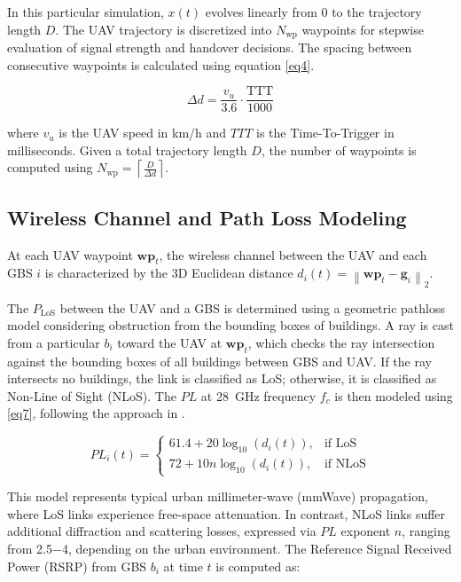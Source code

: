 \documentclass[conference]{IEEEtran}
\begin{document}
In this particular simulation, $x(t)$ evolves linearly from 0 to the trajectory length $D$. The UAV trajectory is discretized into $N_{\text{wp}}$ waypoints for stepwise evaluation of signal strength and handover decisions. The spacing between consecutive waypoints is calculated using equation \eqref{eq4}. 

\begin{equation}
\label{eq4} 
\Delta d = \frac{v_u}{3.6} \cdot \frac{\mathrm{TTT}}{1000}
\end{equation}

where $v_u$ is the UAV speed in km/h and $TTT$ is the Time-To-Trigger in milliseconds. Given a total trajectory length $D$, the number of waypoints is computed using $N_{\text{wp}} = \left\lceil \frac{D}{\Delta d} \right\rceil$.



\subsection{Wireless Channel and Path Loss Modeling}

At each UAV waypoint \(\mathbf{wp}_t\), the wireless channel between the UAV and each GBS $i$ is characterized by the 3D Euclidean distance $d_i(t) = \left\| \mathbf{wp}_t - \mathbf{g}_i \right\|_2$.


The $P_{\mathrm{LoS}}$ between the UAV and a GBS is determined using a geometric pathloss model considering obstruction from the bounding boxes of buildings. A ray is cast from a particular $b_i$ toward the UAV at $\mathbf{wp}_t$, which checks the ray intersection against the bounding boxes of all buildings between GBS and UAV. If the ray intersects no buildings, the link is classified as LoS; otherwise, it is classified as Non-Line of Sight (NLoS). The $PL$ at 28~GHz frequency $f_c$ is then modeled using \eqref{eq7}, following the approach in \cite{6834753}.

\begin{equation}
\label{eq7} 
PL_i(t) = 
\begin{cases}
61.4 + 20 \log_{10}(d_i(t)), & \text{if LoS} \\
72 +  10n\log_{10}(d_i(t)), & \text{if NLoS}
\end{cases}
\end{equation}

This model represents typical urban millimeter-wave (mmWave) propagation, where LoS links experience free-space attenuation. In contrast, NLoS links suffer additional diffraction and scattering losses, expressed via $PL$ exponent $n$, ranging from 2.5$-$4, depending on the urban environment. The Reference Signal Received Power (RSRP) from GBS $b_i$ at time $t$ is computed as:
\end{document}
